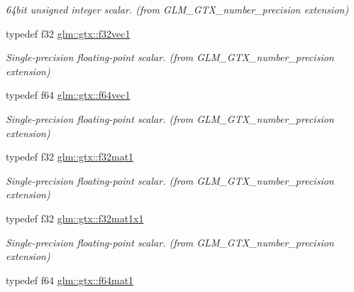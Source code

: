 \begin{DoxyCompactItemize}
\begin{DoxyCompactList}\small\item\em 64bit unsigned integer scalar. (from G\-L\-M\-\_\-\-G\-T\-X\-\_\-number\-\_\-precision extension) \end{DoxyCompactList}\item 
\hypertarget{group__gtx__number__precision_gadab8e598b0b4697629482682bdb7f223}{typedef f32 \hyperlink{group__gtx__number__precision_gadab8e598b0b4697629482682bdb7f223}{glm\-::gtx\-::f32vec1}}\label{group__gtx__number__precision_gadab8e598b0b4697629482682bdb7f223}

\begin{DoxyCompactList}\small\item\em Single-\/precision floating-\/point scalar. (from G\-L\-M\-\_\-\-G\-T\-X\-\_\-number\-\_\-precision extension) \end{DoxyCompactList}\item 
\hypertarget{group__gtx__number__precision_ga44336a26c958d66efdfb5a6c114c538e}{typedef f64 \hyperlink{group__gtx__number__precision_ga44336a26c958d66efdfb5a6c114c538e}{glm\-::gtx\-::f64vec1}}\label{group__gtx__number__precision_ga44336a26c958d66efdfb5a6c114c538e}

\begin{DoxyCompactList}\small\item\em Single-\/precision floating-\/point scalar. (from G\-L\-M\-\_\-\-G\-T\-X\-\_\-number\-\_\-precision extension) \end{DoxyCompactList}\item 
\hypertarget{group__gtx__number__precision_gae5ff376ec910c360f06acc0c2b99260c}{typedef f32 \hyperlink{group__gtx__number__precision_gae5ff376ec910c360f06acc0c2b99260c}{glm\-::gtx\-::f32mat1}}\label{group__gtx__number__precision_gae5ff376ec910c360f06acc0c2b99260c}

\begin{DoxyCompactList}\small\item\em Single-\/precision floating-\/point scalar. (from G\-L\-M\-\_\-\-G\-T\-X\-\_\-number\-\_\-precision extension) \end{DoxyCompactList}\item 
\hypertarget{group__gtx__number__precision_ga01caec78388a82a9a22bd45e5751a38a}{typedef f32 \hyperlink{group__gtx__number__precision_ga01caec78388a82a9a22bd45e5751a38a}{glm\-::gtx\-::f32mat1x1}}\label{group__gtx__number__precision_ga01caec78388a82a9a22bd45e5751a38a}

\begin{DoxyCompactList}\small\item\em Single-\/precision floating-\/point scalar. (from G\-L\-M\-\_\-\-G\-T\-X\-\_\-number\-\_\-precision extension) \end{DoxyCompactList}\item 
\hypertarget{group__gtx__number__precision_ga23f8f53c78b50aa07a113c3d07d01bc9}{typedef f64 \hyperlink{group__gtx__number__precision_ga23f8f53c78b50aa07a113c3d07d01bc9}{glm\-::gtx\-::f64mat1}}\label{group__gtx__number__precision_ga23f8f53c78b50aa07a113c3d07d01bc9}


\end{DoxyCompactItemize}
